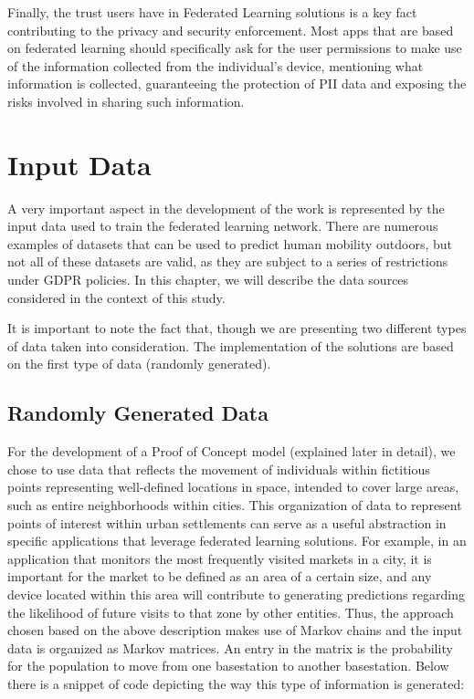 \documentclass[conference]{IEEEtran}
\begin{document}
Finally, the trust users have in Federated Learning solutions is a key fact contributing to the privacy and security enforcement. Most apps that are based on federated learning should specifically ask for the user permissions to make use of the information collected from the individual's device, mentioning what information is collected, guaranteeing the protection of PII data and exposing the risks involved in sharing such information.

\section{Input Data}

A very important aspect in the development of the work is represented by the input data used to train the federated learning network. There are numerous examples of datasets that can be used to predict human mobility outdoors, but not all of these datasets are valid, as they are subject to a series of restrictions under GDPR policies. In this chapter, we will describe the data sources considered in the context of this study.

It is important to note the fact that, though we are presenting two different types of data taken into consideration. The implementation of the solutions are based on the first type of data (randomly generated).

\subsection{Randomly Generated Data}

For the development of a Proof of Concept model (explained later in detail), we chose to use data that reflects the movement of individuals within fictitious points representing well-defined locations in space, intended to cover large areas, such as entire neighborhoods within cities. This organization of data to represent points of interest within urban settlements can serve as a useful abstraction in specific applications that leverage federated learning solutions. For example, in an application that monitors the most frequently visited markets in a city, it is important for the market to be defined as an area of a certain size, and any device located within this area will contribute to generating predictions regarding the likelihood of future visits to that zone by other entities.
Thus, the approach chosen based on the above description makes use of Markov chains and the input data is organized as Markov matrices. An entry in the matrix is the probability for the population to move from one basestation to another basestation. Below there is a snippet of code depicting the way this type of information is generated:
\end{document}
